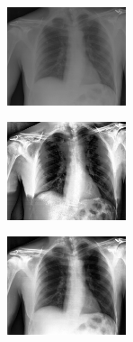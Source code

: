 \documentclass[spanish,twocolumn]{article}
\begin{document}
{\begin{minipage}[b]{1.0\linewidth}
   \begin{minipage}[t]{0.3\linewidth}  
   		\centering
        \includegraphics[width=3.5cm]{Figures/entropia_normal_ssim/imagen3.png}
  	\end{minipage}
  \hspace{1pt}
   \begin{minipage}[t]{0.3\linewidth}  
   		\centering
        \includegraphics[width=3.5cm]{Figures/entropia_normal_ssim/imagen3_210_2_0-078487.png}
  	\end{minipage}
  \hspace{1pt}
   \begin{minipage}[t]{0.3\linewidth}  
   		\centering
        \includegraphics[width=3.5cm]{Figures/entropia_normal_ssim/imagen3_2_2_0-85964.png}
  	\end{minipage}
  \vspace{0.5cm}
    \label{fig:resultado1}

\end{minipage}

\begin{minipage}[t]{0.5\linewidth}  
\end{minipage}

\noindent\begin{minipage}[b]{1.0\linewidth}
  \centering
   

\end{minipage}}
\end{document}
